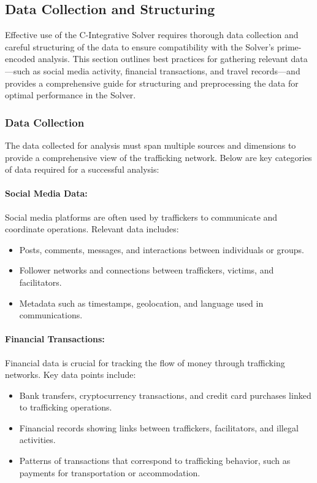 \documentclass[%
 preprint, linenumbers,
 amsmath,amssymb,
 aps, physrev,
]{revtex4-2}
\begin{document}
\subsection{Data Collection and Structuring}

Effective use of the C-Integrative Solver requires thorough data collection and careful structuring of the data to ensure compatibility with the Solver’s prime-encoded analysis. This section outlines best practices for gathering relevant data—such as social media activity, financial transactions, and travel records—and provides a comprehensive guide for structuring and preprocessing the data for optimal performance in the Solver.

\subsubsection{Data Collection}

The data collected for analysis must span multiple sources and dimensions to provide a comprehensive view of the trafficking network. Below are key categories of data required for a successful analysis:

\paragraph{Social Media Data:}
Social media platforms are often used by traffickers to communicate and coordinate operations. Relevant data includes:
\begin{itemize}
    \item Posts, comments, messages, and interactions between individuals or groups.
    \item Follower networks and connections between traffickers, victims, and facilitators.
    \item Metadata such as timestamps, geolocation, and language used in communications.
\end{itemize}

\paragraph{Financial Transactions:}
Financial data is crucial for tracking the flow of money through trafficking networks. Key data points include:
\begin{itemize}
    \item Bank transfers, cryptocurrency transactions, and credit card purchases linked to trafficking operations.
    \item Financial records showing links between traffickers, facilitators, and illegal activities.
    \item Patterns of transactions that correspond to trafficking behavior, such as payments for transportation or accommodation.
\end{itemize}
\end{document}
